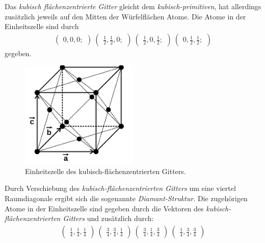 Das \textit{kubisch flächenzentrierte Gitter} gleicht dem
\textit{kubisch-primitiven}, hat
allerdings zusätzlich jeweils auf den Mitten der Würfelflächen Atome.
Die Atome in der Einheitszelle sind durch
\begin{align}
\label{eqn:3*}
\begin{pmatrix}
0, 0, 0;
\end{pmatrix}\
\begin{pmatrix}
\frac{1}{2}, \frac{1}{2}, 0;
\end{pmatrix}\
\begin{pmatrix}
\frac{1}{2}, 0, \frac{1}{2};
\end{pmatrix}\
\begin{pmatrix}
0, \frac{1}{2}, \frac{1}{2};
\end{pmatrix}
\end{align}
gegeben.

\begin{figure}[hhh]
\centering
\includegraphics[width=0.5\textwidth]{abbildungen/fcc.png}
\caption{Einheitszelle des kubisch-flächenzentrierten Gitters.\cite{sample}}
\label{fig:fcc}
\end{figure}

Durch Verschiebung des \textit{kubisch-flächenzentrierten Gitters}
um eine viertel Raumdiagonale ergibt sich die sogenannte
\textit{Diamant-Struktur}.
Die zugehörigen Atome in der Einheitszelle sind gegeben durch die
Vektoren des \textit{kubisch-flächenzentrierten Gitters}
und zusätzlich durch:
\begin{align}
\label{eqn:4*}
\begin{pmatrix}
\frac{1}{4}, \frac{1}{4}, \frac{1}{4}
\end{pmatrix}\
\begin{pmatrix}
\frac{3}{4}, \frac{3}{4}, \frac{1}{4}
\end{pmatrix}\
\begin{pmatrix}
\frac{3}{4}, \frac{1}{4}, \frac{3}{4}
\end{pmatrix}\
\begin{pmatrix}
\frac{1}{4}, \frac{3}{4}, \frac{3}{4}
\end{pmatrix}
\end{align}

